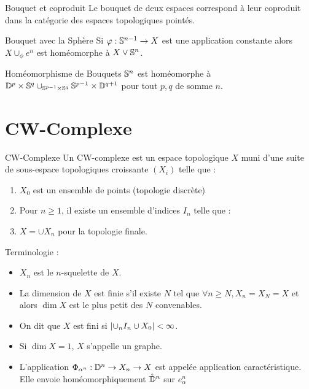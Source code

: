 \documentclass{cours}
\begin{document}
\begin{propositionfr}{Bouquet et coproduit}{}
    Le bouquet de deux espaces correspond à leur coproduit dans la catégorie des espaces topologiques pointés. 
\end{propositionfr}

\begin{propositionfr}{Bouquet avec la Sphère}{}
    Si $\phi : \S^{n -1} \to X$ est une application constante alors $X \cup_{\phi} e^{n}$ est homéomorphe à $X \lor \S^{n}$.
\end{propositionfr}

\begin{propositionfr}{Homéomorphisme de Bouquets}{}
    $\S^{n}$ est homéomorphe à $\D^{p} \times \S^{q}\cup_{\S^{p - 1} \times \S^{q}}\S^{p - 1} \times \D^{q + 1}$ pour tout $p, q$ de somme $n$. 
\end{propositionfr}

\section{CW-Complexe}
\begin{définition}{CW-Complexe}{}
    Un CW-complexe est un espace topologique $X$ muni d'une suite de sous-espace topologiques croissante $(X_{i})$ telle que :
    \begin{enumerate}
        \item $X_{0}$ est un ensemble de points (topologie discrète)
        \item Pour $n \geq 1$, il existe un ensemble d'indices $I_{n}$ telle que : 
        \begin{center}
        \end{center}
        \item $X = \cup X_{n}$ pour la topologie finale. 
    \end{enumerate}
    Terminologie :
    \begin{itemize}
        \item $X_{n}$ est le $n$-squelette de $X$. 
        \item La dimension de $X$ est finie s'il existe $N$ tel que $\forall n \geq N, X_{n} = X_{N} = X$ et alors $\dim X$ est le plus petit des $N$ convenables. 
        \item On dit que $X$ est fini si $\abs{\cup_{n}I_{n} \cup X_{0}} < \infty$.
        \item Si $\dim X = 1$, $X$ s'appelle un graphe.
        \item L'application $\Phi_{\alpha^{n}} : \D^{n} \to X_{n} \to X$ est appelée application caractéristique. Elle envoie homéomorphiquement $\mathring{\D}^{n}$ sur $e_{\alpha}^{n}$
    \end{itemize}
\end{définition}
\end{document}
